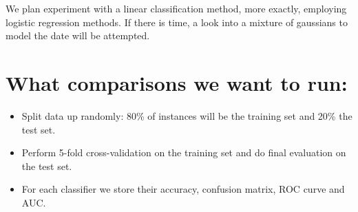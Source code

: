 \documentclass[a4paper,11pt]{article}
\begin{document}
We plan experiment with a linear classification method, more exactly, employing logistic regression methods. If there is time, a look into a mixture of gaussians to model the date will be attempted. 

\section*{What comparisons we want to run:}
\begin{itemize}
	\item Split data up randomly: 80\% of instances will be the training set and 20\% the test set.
	\item Perform 5-fold cross-validation on the training set and do final evaluation on the test set.
	\item For each classifier we store their accuracy, confusion matrix, ROC curve and AUC.
\end{itemize}
\end{document}
